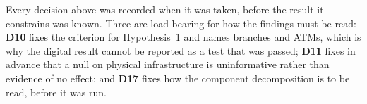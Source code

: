 \noindent
Every decision above was recorded when it was taken, before the result it constrains was known.
Three are load-bearing for how the findings must be read: \textbf{D10} fixes the criterion for
Hypothesis~1 and names branches and ATMs, which is why the digital result cannot be reported as a
test that was passed; \textbf{D11} fixes in advance that a null on physical infrastructure is
uninformative rather than evidence of no effect; and \textbf{D17} fixes how the component
decomposition is to be read, before it was run.

